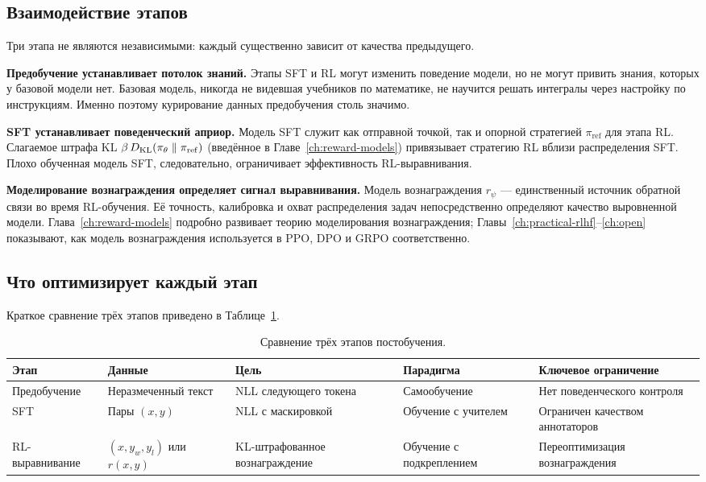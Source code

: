 \subsection{Взаимодействие этапов}

Три этапа не являются независимыми: каждый существенно зависит от качества предыдущего.

\textbf{Предобучение устанавливает потолок знаний.} Этапы SFT и RL могут изменить поведение модели, но не могут привить знания, которых у базовой модели нет. Базовая модель, никогда не видевшая учебников по математике, не научится решать интегралы через настройку по инструкциям. Именно поэтому курирование данных предобучения столь значимо.

\textbf{SFT устанавливает поведенческий априор.} Модель SFT служит как отправной точкой, так и опорной стратегией $\pi_{\mathrm{ref}}$ для этапа RL. Слагаемое штрафа KL $\beta\,D_{\mathrm{KL}}\!\left(\pi_\theta\;\|\;\pi_{\mathrm{ref}}\right)$ (введённое в Главе~\ref{ch:reward-models}) привязывает стратегию RL вблизи распределения SFT. Плохо обученная модель SFT, следовательно, ограничивает эффективность RL-выравнивания.

\textbf{Моделирование вознаграждения определяет сигнал выравнивания.} Модель вознаграждения $r_\psi$ --- единственный источник обратной связи во время RL-обучения. Её точность, калибровка и охват распределения задач непосредственно определяют качество выровненной модели. Глава~\ref{ch:reward-models} подробно развивает теорию моделирования вознаграждения; Главы~\ref{ch:practical-rlhf}--\ref{ch:open} показывают, как модель вознаграждения используется в PPO, DPO и GRPO соответственно.

\subsection{Что оптимизирует каждый этап}

Краткое сравнение трёх этапов приведено в Таблице~\ref{tab:pipeline-comparison}.

\begin{table}[ht]
\centering
\caption{Сравнение трёх этапов постобучения.}
\label{tab:pipeline-comparison}
\footnotesize
\begin{tabular}{@{}p{2.3cm}p{2.9cm}p{2.6cm}p{2.6cm}p{2.8cm}@{}}
\toprule
\textbf{Этап} & \textbf{Данные} & \textbf{Цель} & \textbf{Парадигма} & \textbf{Ключевое ограничение} \\
\midrule
Предобучение & Неразмеченный текст & NLL следующего токена & Самообучение & Нет поведенческого контроля \\
SFT & Пары $(x, y)$ & NLL с маскировкой & Обучение с учителем & Ограничен качеством аннотаторов \\
RL-выравнивание & $(x, y_w, y_l)$ или $r(x,y)$ & KL-штрафованное вознаграждение & Обучение с подкреплением & Переоптимизация вознаграждения \\
\bottomrule
\end{tabular}
\end{table}

